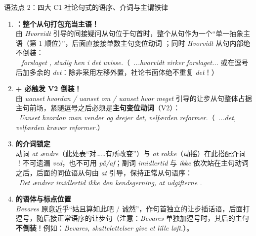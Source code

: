 \begin{grammatikbox}{语法点 2：四大 C1 社论句式的语序、介词与主谓铁律}
\begin{enumerate}
  \item \textbf{：整个从句打包充当主语！}\\
    由 \textit{Hvorvidt} 引导的间接疑问从句位于句首时，整个从句作为一个“单一抽象主语（第 1 顺位）”，后面直接接单数主句变位动词 ；同时 \textit{Hvorvidt} 从句内部绝不倒装：\\
    \ \textit{ forslaget ,  stadig hen i det uvisse.}（\ \textit{...hvorvidt virker forslaget...} 或在逗号后加多余的 \textit{det}：除非采用左移外置，社论书面体绝不重复 \textit{det}！）
  \item \textbf{ + 必触发 V2 倒装！}\\
    由 \textit{uanset hvordan / uanset om / uanset hvor meget} 引导的让步从句整体占据主句前场，紧随逗号之后必须是\textbf{主句变位动词}（V2）：\\
    \ \textit{Uanset hvordan man vender og drejer det,  velfærden reformer.}（\ \textit{...det, velfærden kræver reformer.}）
  \item \textbf{ 的介词锁定}\\
    动词 \textit{at ændre}（此处表“对……有所改变”）与 \textit{at rokke}（动摇）在此搭配介词 ！不可遗漏 \textit{ved}，也不可用 \textit{på/af}；副词 \textit{imidlertid} 与 \textit{ikke} 依次站在主句动词之后，后面的同位语从句由 \textit{at} 引导，保持正常从句语序：\\
    \ \textit{Det ændrer imidlertid ikke  den kendsgerning, at udgifterne .}
  \item \textbf{ 的语体与标点位置}\\
    \textit{Bevares} 原意近乎“姑且算如此吧 / 诚然”，作句首独立的让步插话语，后面打逗号，随后接正常语序的让步句（注意：\textit{Bevares} 单独加逗号时，其后的主句\textbf{不倒装}！例如：\textit{Bevares, skattelettelser  give et lille løft.}）。
\end{enumerate}
\end{grammatikbox}

